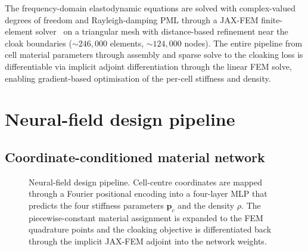 \documentclass[preprint,12pt]{elsarticle}
\newcommand{\mbf}[1]{\mathbf{#1}}
\newcommand{\mcl}[1]{\mathcal{#1}}
\begin{document}
The frequency-domain elastodynamic equations are solved with
complex-valued degrees of freedom and Rayleigh-damping PML through a
JAX-FEM finite-element solver~\citep{xu2020jaxfem} on a triangular mesh
with distance-based refinement near the cloak boundaries
($\sim\!246{,}000$ elements, $\sim\!124{,}000$ nodes). The entire
pipeline from cell material parameters through assembly and sparse
solve to the cloaking loss is differentiable via implicit adjoint
differentiation through the linear FEM solve, enabling gradient-based
optimisation of the per-cell stiffness and density.

\section{Neural-field design pipeline}\label{sec:method}

\subsection{Coordinate-conditioned material network}

\begin{figure}[htbp]
  \centering
  \caption{Neural-field design pipeline. Cell-centre coordinates are
  mapped through a Fourier positional encoding into a four-layer MLP
  that predicts the four stiffness parameters $\mbf{p}_c$
  and the density $\rho$. The piecewise-constant material assignment is expanded to
  the FEM quadrature points and the cloaking objective is differentiated
  back through the implicit JAX-FEM adjoint into the network weights.}
  \label{fig:nf-arch}
\end{figure}
\end{document}
